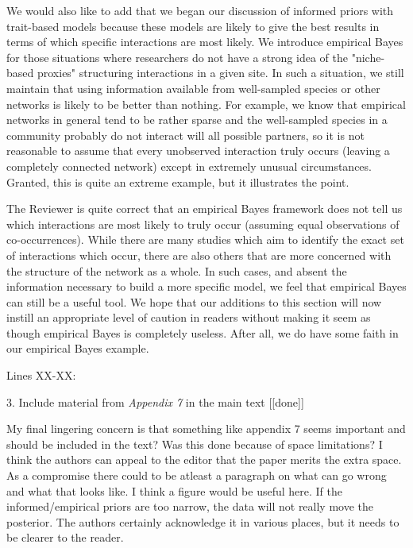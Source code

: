 \documentclass[12pt]{letter}
\newenvironment{refquote}{\bigskip \begin{it}}{\end{it}\smallskip}
\begin{document}
		We would also like to add that we began our discussion of informed priors with trait-based models because these models are likely to give the best results in terms of which specific interactions are most likely. We introduce empirical Bayes for those situations where researchers do not have a strong idea of the "niche-based proxies" structuring interactions in a given site. In such a situation, we still maintain that using information available from well-sampled species or other networks is likely to be better than nothing. For example, we know that empirical networks in general tend to be rather sparse and the well-sampled species in a community probably do not interact will all possible partners, so it is not reasonable to assume that every unobserved interaction truly occurs (leaving a completely connected network) except in extremely unusual circumstances. Granted, this is quite an extreme example, but it illustrates the point. 


		The Reviewer is quite correct that an empirical Bayes framework does not tell us which interactions are most likely to truly occur (assuming equal observations of co-occurrences). While there are many studies which aim to identify the exact set of interactions which occur, there are also others that are more concerned with the structure of the network as a whole. In such cases, and absent the information necessary to build a more specific model, we feel that empirical Bayes can still be a useful tool. We hope that our additions to this section will now instill an appropriate level of caution in readers without making it seem as though empirical Bayes is completely useless. After all, we do have some faith in our empirical Bayes example.


		Lines XX-XX:

		\begin{quotation}


		\end{quotation} 


	3. Include material from \emph{Appendix 7} in the main text [[done]]

		\begin{refquote}
		
			My final lingering concern is that something like appendix 7 seems important and should be included in the text? Was this done because of space limitations? I think the authors can appeal to the editor that the paper merits the extra space. As a compromise there could to be atleast a paragraph on what can go wrong and what that looks like. I think a figure would be useful here. If the informed/empirical priors are too narrow, the data will not really move the posterior. The authors certainly acknowledge it in various places, but it needs to be clearer to the reader.

		\end{refquote}
\end{document}
